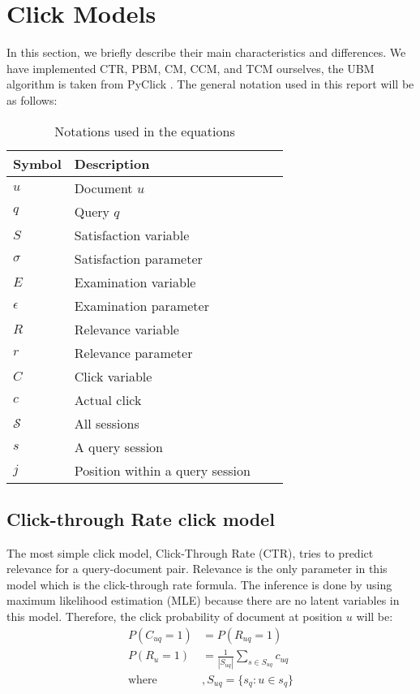 \section{Click Models}
\label{sec:methodology}
In this section, we briefly describe their main characteristics and differences. We have implemented CTR, PBM, CM, CCM, and TCM ourselves, the UBM algorithm is taken from PyClick \cite{PyClick}. The general notation used in this report will be as follows:

\begin{table}[ht]
	\centering
	\begin{tabular}{l|lll|}
		\hline
		Symbol & Description \\
		\hline
		$u$	& Document $u$ \\
		$q$	& Query $q$ \\
		$ S $ & Satisfaction variable \\
		$ \sigma $ & Satisfaction parameter \\
		$ E $ & Examination variable \\
		$ \epsilon $ & Examination parameter \\
		$ R $ & Relevance variable \\
		$ r $ & Relevance parameter \\
		$ C $ & Click variable \\
		$ c $ & Actual click \\
		$ \mathcal{S} $ & All sessions \\
		$ s $ & A query session \\
		$ j $ & Position within a query session \\
		\hline
	\end{tabular}
	\caption{Notations used in the equations}
	\label{table:notations}
\end{table}

\subsection{Click-through Rate click model}
The most simple click model, Click-Through Rate (CTR), tries to predict relevance for a query-document pair. Relevance is the only parameter in this model which is the click-through rate formula. The inference is done by using maximum likelihood estimation (MLE) because there are no latent variables in this model. Therefore, the click probability of document at position $u$ will be:
\begin{align}
	P(C_{uq}=1) &= P(R_{uq}=1) \nonumber \\
	P(R_{u}=1) &= \frac{1}{|S_{uq}|} \sum_{s \in S_{uq}} c_{uq} \label{eq:ctr_rel}\\
	\text{where}&, S_{uq} = \{ s_q : u \in s_q \} \nonumber
\end{align}


